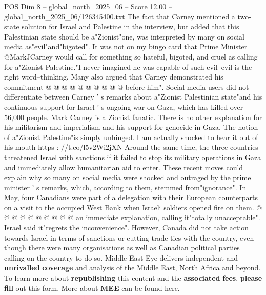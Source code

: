 \begin{textsample}{POS Dim 8 – global\_north\_2025\_06 – Score 12.00 – global\_north\_2025\_06/126345400.txt}
The fact that Carney mentioned a two-state solution for Israel and Palestine in the interview, but added that this Palestinian state should be a"Zionist"one, was interpreted by many on social media as"evil"and"bigoted".
It was not on my bingo card that Prime Minister @MarkJCarney would call for something so hateful, bigoted, and cruel as calling for a"Zionist Palestine."I never imagined he was capable of such evil--evil is the right word--thinking.
Many also argued that Carney demonstrated his commitment @ @ @ @ @ @ @ @ @ @ before him".
Social media users did not differentiate between Carney ' s remarks about a"Zionist Palestinian state"and his continuous support for Israel ' s ongoing war on Gaza, which has killed over 56,000 people.
Mark Carney is a Zionist fanatic.
There is no other explanation for his militarism and imperialism and his support for genocide in Gaza.
The notion of a"Zionist Palestine"is simply unhinged.
I am actually shocked to hear it out of his mouth https : //t.co/l5v2Wi2jXN Around the same time, the three countries threatened Israel with sanctions if it failed to stop its military operations in Gaza and immediately allow humanitarian aid to enter.
These recent moves could explain why so many on social media were shocked and outraged by the prime minister ' s remarks, which, according to them, stemmed from"ignorance".
In May, four Canadians were part of a delegation with their European counterparts on a visit to the occupied West Bank when Israeli soldiers opened fire on them. @ @ @ @ @ @ @ @ @ @ an immediate explanation, calling it"totally unacceptable".
Israel said it"regrets the inconvenience".
However, Canada did not take action towards Israel in terms of sanctions or cutting trade ties with the country, even though there were many organisations as well as Canadian political parties calling on the country to do so.
Middle East Eye delivers independent and \textbf{unrivalled} \textbf{coverage} and analysis of the Middle East, North Africa and beyond.
To learn more about \textbf{republishing} this content and the \textbf{associated} \textbf{fees}, \textbf{please} \textbf{fill} out this form.
More about \textbf{MEE} can be found here.

\end{textsample}
